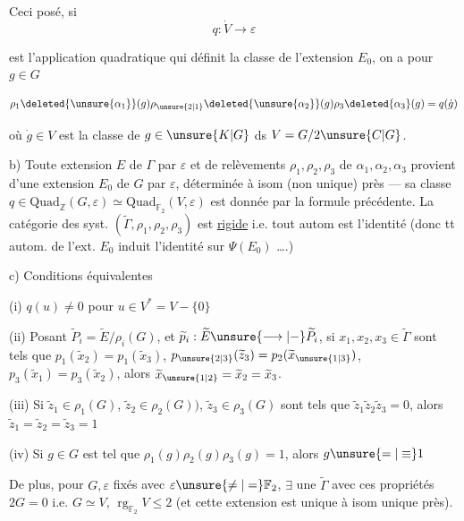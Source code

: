 Ceci posé, si
\[
q:\dot V\longrightarrow\varepsilon
\]

est l'application quadratique qui définit la classe de l'extension $E_0$, on a pour $g\in G$

\[
\rho_1\deleted{\unsure{\alpha_1}}(g)\rho_{\unsure{2|1}}\deleted{\unsure{\alpha_2}}(g)\rho_3\deleted{\alpha_3}(g)=q(\dot g)
\]

où $\dot g\in V$ est la classe de $g\in\unsure{K|G}$ ds $V=G/2\unsure{C|G}$.

b) Toute  extension  $E$ de $\Gamma$ par $\varepsilon$ et de relèvements $\rho_1,\rho_2,\rho_3$ de $\alpha_1,\alpha_2,\alpha_3$ provient d'une extension $E_0$ de $G$ par $\varepsilon$, déterminée à isom (non unique) près --- sa classe $q\in\mathrm{Quad}_{\mathbb Z}(G,\varepsilon)\simeq\mathrm{Quad}_{\mathbb F_2}(V,\varepsilon)$ est donnée par la formule précédente. La catégorie  des  syst. $(\widetilde\Gamma,\rho_1,\rho_2,\rho_3)$ est \uline{rigide} i.e. tout autom est l'identité (donc tt autom. de l'ext. $E_0$ induit l'identité sur  $\Psi(E_0)$ \dots.)

c) Conditions équivalentes

(i)  $q(u)\ne0$ pour  $u\in V^*=V-\{0\}$

(ii) Posant $\widetilde P_i=\widetilde E/\rho_i(G)$,  et $\widetilde p_i:\widetilde E\unsure{\longrightarrow|\mathbin{-}}\widetilde P_i$, si $x_1,x_2,x_3\in\widetilde\Gamma$ sont tels que $p_1(\widetilde x_2)=p_1(\widetilde x_3)$, $p_{\unsure{2|3}}(\widetilde z_3)=p_2(\widetilde x_{\unsure{1|3}})$, $p_3(\widetilde x_1)=p_3(\widetilde x_2)$, alors $\widetilde x_{\unsure{1|2}}=\widetilde x_2=\widetilde x_3$.

(iii) Si $\widetilde z_1\in\rho_1(G)$, $\widetilde z_2\in\rho_2(G))$, $\widetilde z_3\in\rho_3(G)$ sont tels que $\widetilde z_1\widetilde z_2\widetilde z_3=0$, alors $\widetilde z_1=\widetilde z_2=\widetilde z_3=1$

(iv) Si $g\in G$ est tel que $\rho_1(g)\rho_2(g)\rho_3(g)=1$, alors $g\unsure{=|\equiv}1$

De plus, pour $G,\varepsilon$ fixés avec $\varepsilon\unsure{\ne|=}\mathbb F_2$, $\exists$ une $\widetilde\Gamma$  avec ces propriétés  $2G=0$ i.e. $G\simeq V$, $\operatorname{rg}_{\mathbb F_2}V\leq2$ (et cette extension est unique à isom unique près).

